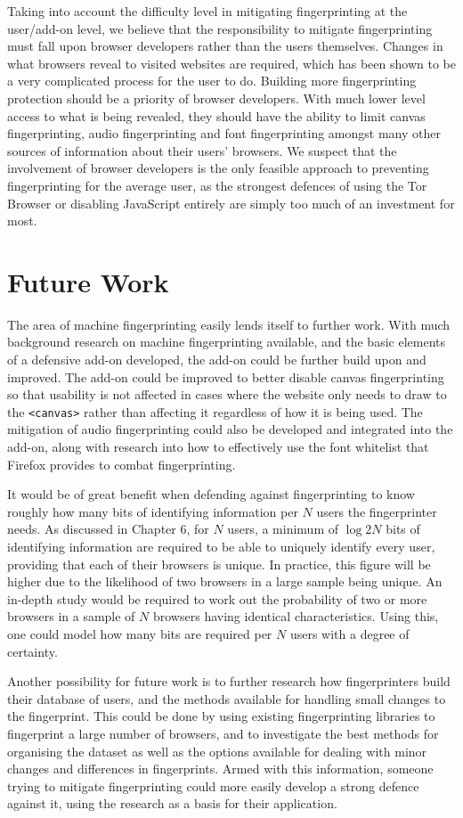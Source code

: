 Taking into account the difficulty level in mitigating fingerprinting at the user/add-on level, we believe that the responsibility to mitigate fingerprinting must fall upon browser developers rather than the users themselves.
Changes in what browsers reveal to visited websites are required, which has been shown to be a very complicated process for the user to do.
Building more fingerprinting protection should be a priority of browser developers.
With much lower level access to what is being revealed, they should have the ability to limit canvas fingerprinting, audio fingerprinting and font fingerprinting amongst many other sources of information about their users' browsers.
We suspect that the involvement of browser developers is the only feasible approach to preventing fingerprinting for the average user, as the strongest defences of using the Tor Browser or disabling JavaScript entirely are simply too much of an investment for most.

\section{Future Work}

The area of machine fingerprinting easily lends itself to further work.
With much background research on machine fingerprinting available, and the basic elements of a defensive add-on developed, the add-on could be further build upon and improved.
The add-on could be improved to better disable canvas fingerprinting so that usability is not affected in cases where the website only needs to draw to the \texttt{<canvas>} rather than affecting it regardless of how it is being used.
The mitigation of audio fingerprinting could also be developed and integrated into the add-on, along with research into how to effectively use the font whitelist that Firefox provides to combat fingerprinting.

It would be of great benefit when defending against fingerprinting to know roughly how many bits of identifying information per $N$ users the fingerprinter needs.
As discussed in Chapter 6, for $N$ users, a minimum of $\log{2}N$ bits of identifying information are required to be able to uniquely identify every user, providing that each of their browsers is unique.
In practice, this figure will be higher due to the likelihood of two browsers in a large sample being unique.
An in-depth study would be required to work out the probability of two or more browsers in a sample of $N$ browsers having identical characteristics.
Using this, one could model how many bits are required per $N$ users with a degree of certainty.

Another possibility for future work is to further research how fingerprinters build their database of users, and the methods available for handling small changes to the fingerprint.
This could be done by using existing fingerprinting libraries to fingerprint a large number of browsers, and to investigate the best methods for organising the dataset as well as the options available for dealing with minor changes and differences in fingerprints.
Armed with this information, someone trying to mitigate fingerprinting could more easily develop a strong defence against it, using the research as a basis for their application.

